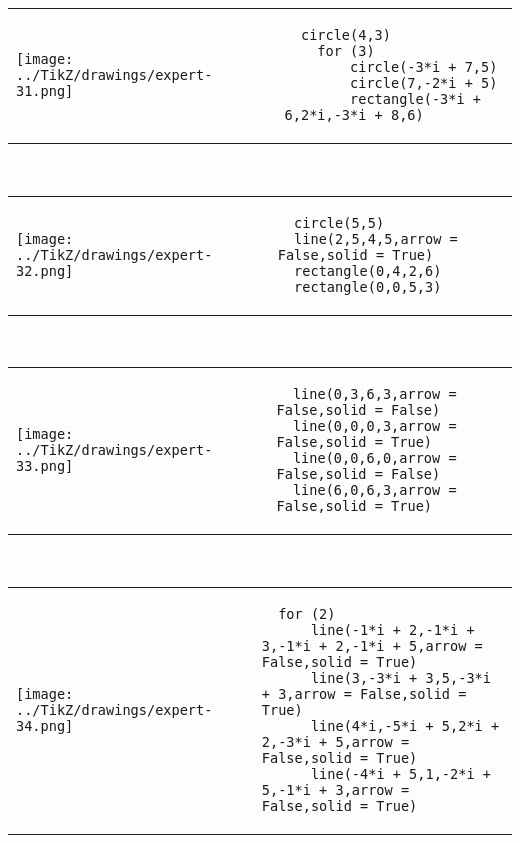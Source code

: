             \begin{tabular}{ll}
    \texttt{[image: ../TikZ/drawings/expert-31.png]}&
    
        \begin{minipage}{10cm}
        \begin{verbatim}
  circle(4,3)
    for (3)
        circle(-3*i + 7,5)
        circle(7,-2*i + 5)
        rectangle(-3*i + 6,2*i,-3*i + 8,6)
        \end{verbatim}
\end{minipage}

    \end{tabular}        
            \\

            \begin{tabular}{ll}
    \texttt{[image: ../TikZ/drawings/expert-32.png]}&
    
        \begin{minipage}{10cm}
        \begin{verbatim}
  circle(5,5)
  line(2,5,4,5,arrow = False,solid = True)
  rectangle(0,4,2,6)
  rectangle(0,0,5,3)
        \end{verbatim}
\end{minipage}

    \end{tabular}        
            \\

            \begin{tabular}{ll}
    \texttt{[image: ../TikZ/drawings/expert-33.png]}&
    
        \begin{minipage}{10cm}
        \begin{verbatim}
  line(0,3,6,3,arrow = False,solid = False)
  line(0,0,0,3,arrow = False,solid = True)
  line(0,0,6,0,arrow = False,solid = False)
  line(6,0,6,3,arrow = False,solid = True)
        \end{verbatim}
\end{minipage}

    \end{tabular}        
            \\

            \begin{tabular}{ll}
    \texttt{[image: ../TikZ/drawings/expert-34.png]}&
    
        \begin{minipage}{10cm}
        \begin{verbatim}
  for (2)
      line(-1*i + 2,-1*i + 3,-1*i + 2,-1*i + 5,arrow = False,solid = True)
      line(3,-3*i + 3,5,-3*i + 3,arrow = False,solid = True)
      line(4*i,-5*i + 5,2*i + 2,-3*i + 5,arrow = False,solid = True)
      line(-4*i + 5,1,-2*i + 5,-1*i + 3,arrow = False,solid = True)
        \end{verbatim}
\end{minipage}

    \end{tabular}        
            \\

